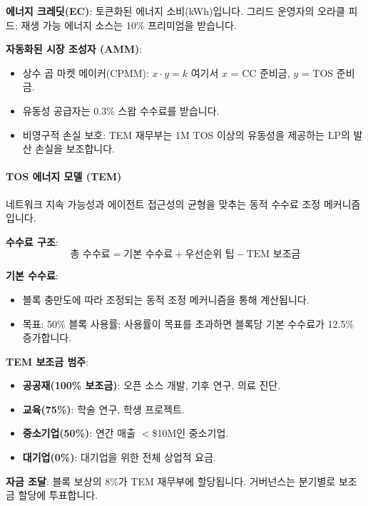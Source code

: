 \documentclass[11pt]{article}
\begin{document}
\textbf{에너지 크레딧(EC)}: 토큰화된 에너지 소비(kWh)입니다. 그리드 운영자의 오라클 피드; 재생 가능 에너지 소스는 10\% 프리미엄을 받습니다.

\textbf{자동화된 시장 조성자 (AMM)}:
\begin{itemize}[noitemsep]
  \item 상수 곱 마켓 메이커(CPMM): $x \cdot y = k$ 여기서 $x$ = CC 준비금, $y$ = TOS 준비금.
  \item 유동성 공급자는 0.3\% 스왑 수수료를 받습니다.
  \item 비영구적 손실 보호: TEM 재무부는 1M TOS 이상의 유동성을 제공하는 LP의 발산 손실을 보조합니다.
\end{itemize}

\paragraph{TOS 에너지 모델 (TEM)}
네트워크 지속 가능성과 에이전트 접근성의 균형을 맞추는 동적 수수료 조정 메커니즘입니다.

\textbf{수수료 구조}:
\begin{equation}
\text{총 수수료} = \text{기본 수수료} + \text{우선순위 팁} - \text{TEM 보조금}
\end{equation}

\textbf{기본 수수료}:
\begin{itemize}[noitemsep]
  \item 블록 충만도에 따라 조정되는 동적 조정 메커니즘을 통해 계산됩니다.
  \item 목표: 50\% 블록 사용률; 사용률이 목표를 초과하면 블록당 기본 수수료가 12.5\% 증가합니다.
\end{itemize}

\textbf{TEM 보조금 범주}:
\begin{itemize}[noitemsep]
  \item \textbf{공공재(100\% 보조금)}: 오픈 소스 개발, 기후 연구, 의료 진단.
  \item \textbf{교육(75\%)}: 학술 연구, 학생 프로젝트.
  \item \textbf{중소기업(50\%)}: 연간 매출 $<$\$10M인 중소기업.
  \item \textbf{대기업(0\%)}: 대기업을 위한 전체 상업적 요금.
\end{itemize}

\textbf{자금 조달}: 블록 보상의 8\%가 TEM 재무부에 할당됩니다. 거버넌스는 분기별로 보조금 할당에 투표합니다.
\end{document}
